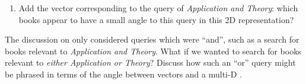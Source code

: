 \begin{reduce}
\begin{exercise}
\begin{enumerate}
\item Add the vector corresponding to the query of \emph{Application and Theory}: which books appear to have a small angle to this query in this 2D representation?

\end{enumerate}
\end{exercise}




\begin{exercise}  
The discussion on  only considered queries which were ``and'', such as a search for books relevant to \emph{Application and Theory}.
What if we wanted to search for books relevant to \emph{either Application or Theory}?
Discuss how such an ``or'' query might be phrased in terms of the angle between vectors and a multi-D .
\end{exercise}





\end{reduce}
